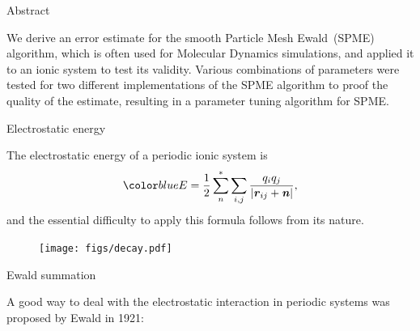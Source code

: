 \documentclass[final,hyperref={pdfpagelabels=false}]{beamer}
\begin{document}
\begin{frame}{}
    \vfill
    \vspace{-1cm}
    \begin{columns}[t]
      \begin{column}{.32\linewidth}
        \vfill
        \begin{block}{\large Abstract}
          \vspace{1ex}
          \begin{minipage}[c]{.975\linewidth}
          We derive an error estimate for the smooth Particle Mesh Ewald~(SPME)
          algorithm, which is often used for Molecular Dynamics simulations, and
          applied it to an ionic system to test its va\-lid\-i\-ty. Various
          combinations of parameters were tested for two different
          implementations of the SPME algorithm to proof the quality of the
          estimate, resulting in a parameter tuning algorithm for SPME.
        \end{minipage}
        \end{block}
        \vfill
        \begin{block}{\large Electrostatic energy}
          \vspace{1ex}
          \begin{minipage}[c]{.975\linewidth}
          The electrostatic energy of a periodic ionic system is 
          \begin{equation*}\bluec{ E = \frac12
              \sum^\ast_{n}\sum_{i,j}\frac{q_i q_j}{\vert \v r_{ij} +
                \v n\vert},}
          \end{equation*} 
          and the essential difficulty to apply this formula follows from its 
           nature.
          \vspace*{-1.2ex}
          \begin{figure}
            \centering 
            \texttt{[image: figs/decay.pdf]}
          \end{figure}
          \vspace*{-1.5ex}
        \end{minipage}
        \end{block}
        \vfill
        \begin{block}{\large Ewald summation}
          \vspace{1ex}
          \begin{minipage}[c]{.975\linewidth}
          A good way to deal with the electrostatic in\-ter\-action in periodic
          systems was proposed by Ewald in 1921:
          \begin{align*}

\end{align*}
\end{minipage}
\end{block}
\end{column}
\end{columns}
\end{frame}
\end{document}

